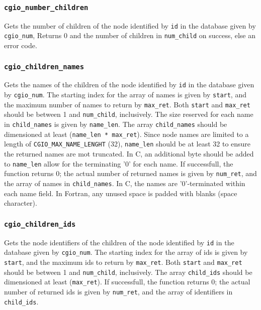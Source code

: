 \subsubsection{\texttt{cgio\_number\_children}} \label{number_children}
    \noindent
    Gets the number of children of the node identified by \texttt{id} in the
    database given by \texttt{cgio\_num}, Returns 0 and the number of children
    in \texttt{num\_child} on success, else an error code.

\subsubsection{\texttt{cgio\_children\_names}} \label{children_names}
    \noindent
    Gets the names of the children of the node identified by \texttt{id} in
    the database given by \texttt{cgio\_num}. The starting index for the
    array of names is given by \texttt{start}, and the maximum number of
    names to return by \texttt{max\_ret}. Both \texttt{start} and \texttt{max\_ret}
    should be between 1 and \texttt{num\_child}, inclusively. The size reserved
    for each name in \texttt{child\_names} is given by \texttt{name\_len}.
    The array \texttt{child\_names} should be dimensioned at least
    (\texttt{name\_len * max\_ret}). Since node names are limited to a length
    of \texttt{CGIO\_MAX\_NAME\_LENGHT} (32), \texttt{name\_len} should be at
    least 32 to ensure the returned names are mot truncated. In C, an
    additional byte should be added to \texttt{name\_len} allow for the
    terminating '0' for each name. If successfull, the function returns 0;
    the actual number of returned names is given by \texttt{num\_ret},
    and the array of names in \texttt{child\_names}. In C, the names are
    '0'-terminated within each name field. In Fortran, any unused space
    is padded with blanks (space character).

\subsubsection{\texttt{cgio\_children\_ids}} \label{children_ids}
    \noindent
    Gets the node identifiers of the children of the node identified by
    \texttt{id} in the database given by \texttt{cgio\_num}.
    The starting index for the array of ids is given by \texttt{start},
    and the maximum ids to return by \texttt{max\_ret}. Both \texttt{start}
    and \texttt{max\_ret} should be between 1 and \texttt{num\_child}, inclusively.
    The array \texttt{child\_ids} should be dimensioned at least
    (\texttt{max\_ret}). If successfull, the function returns 0; the
    actual number of returned ids is given by \texttt{num\_ret}, and the
    array of identifiers in \texttt{child\_ids}.

